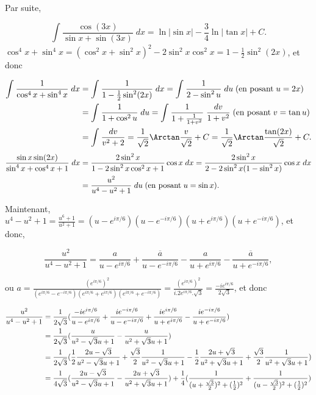 {{Par suite,

$$\int_{}^{}\frac{\cos(3x)}{\sin x+\sin(3x)}\;dx=\ln|\sin x|-\frac{3}{4}\ln|\tan x|+C.$$
$\cos^4x+\sin^4x=(\cos^2x+\sin^2x)^2-2\sin^2x\cos^2x=1-\frac{1}{2}\sin^2(2x)$, et donc

\begin{align*}\ensuremath
\int_{}^{}\frac{1}{\cos^4x+\sin^4x}\;dx&=\int_{}^{}\frac{1}{1-\frac{1}{2}\sin^2(2x)}\;dx
=\int_{}^{}\frac{1}{2-\sin^2u}\;du\;(\mbox{en posant}\;u=2x)\\
 &=\int_{}^{}\frac{1}{1+\cos^2u}\;du=\int_{}^{}\frac{1}{1+\frac{1}{1+v^2}}\;\frac{dv}{1+v^2}\;(\mbox{en posant}\;v=\tan u)\\
 &=\int_{}^{}\frac{dv}{v^2+2}=\frac{1}{\sqrt{2}}\Arctan\frac{v}{\sqrt{2}}+C
=\frac{1}{\sqrt{2}}\Arctan\frac{\tan(2x)}{\sqrt{2}}+C.
\end{align*}
\begin{align*}\ensuremath
\frac{\sin x\sin(2x)}{\sin^4x+\cos^4x+1}\;dx&=\frac{2\sin^2x}{1-2\sin^2x\cos^2x+1}\cos x\;dx=\frac{2\sin^2x}{2-2\sin^2x(1-\sin^2x)}\cos x\;dx\\
 &=\frac{u^2}{u^4-u^2+1}\;du\;(\mbox{en posant}\;u=\sin x).
\end{align*}

Maintenant, $u^4-u^2+1=\frac{u^6+1}{u^2+1}=(u-e^{i\pi/6})(u-e^{-i\pi/6})(u+e^{i\pi/6})(u+e^{-i\pi/6})$, et donc,

$$\frac{u^2}{u^4-u^2+1}=\frac{a}{u-e^{i\pi/6}}+\frac{\overline{a}}{u-e^{-i\pi/6}}-\frac{a}{u+e^{i\pi/6}}-\frac{\overline{a}}{u+e^{-i\pi/6}},$$

ou $a=\frac{(e^{i\pi/6})^2}{(e^{i\pi/6}-e^{-i\pi/6})(e^{i\pi/6}+e^{i\pi/6})(e^{i\pi/6}+e^{-i\pi/6})}=
\frac{(e^{i\pi/6})^2}{i.2e^{i\pi/6}.\sqrt{3}}=\frac{-ie^{i\pi/6}}{2\sqrt{3}}$, et donc

\begin{align*}\ensuremath
\frac{u^2}{u^4-u^2+1}&=\frac{1}{2\sqrt{3}}(\frac{-ie^{i\pi/6}}{u-e^{i\pi/6}}+\frac{ie^{-i\pi/6}}{u-e^{-i\pi/6}}+\frac{ie^{i\pi/6}}{u+e^{i\pi/6}}-\frac{ie^{-i\pi/6}}{u+e^{-i\pi/6}})\\
 &=\frac{1}{2\sqrt{3}}(\frac{u}{u^2-\sqrt{3}u+1}-\frac{u}{u^2+\sqrt{3}u+1})\\
 &=\frac{1}{2\sqrt{3}}(\frac{1}{2}\frac{2u-\sqrt{3}}{u^2-\sqrt{3}u+1}+\frac{\sqrt{3}}{2}\frac{1}
 {u^2-\sqrt{3}u+1}-\frac{1}{2}\frac{2u+\sqrt{3}}{u^2+\sqrt{3}u+1}+\frac{\sqrt{3}}{2}\frac{1}{u^2+\sqrt{3}u+1})\\
 &=\frac{1}{4\sqrt{3}}(\frac{2u-\sqrt{3}}{u^2-\sqrt{3}u+1}-\frac{2u+\sqrt{3}}{u^2+\sqrt{3}u+1})
 +\frac{1}{4}(\frac{1}{(u+\frac{\sqrt{3}}{2})^2+(\frac{1}{2})^2}+
 \frac{1}{(u-\frac{\sqrt{3}}{2})^2+(\frac{1}{2})^2})
\end{align*}

}}
